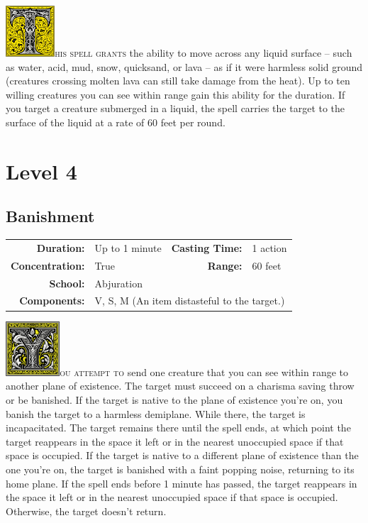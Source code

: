 \documentclass[12pt,showtrims]{memoir}
\begin{document}
\vspace{1\baselineskip}\noindent
\lettrine[lines=4]{\includegraphics[height=54pt]{initials/T.png}}{his spell grants} the ability to move across any liquid surface -- such as water, acid, mud, snow, quicksand, or lava -- as if it were harmless solid ground (creatures crossing molten lava can still take damage from the heat). Up to ten willing creatures you can see within range gain this ability for the duration. If you target a creature submerged in a liquid, the spell carries the target to the surface of the liquid at a rate of 60 feet per round.

\newpage
\chapter*{Level 4} 
\section*{Banishment}

{
\small\centering\vspace{-6pt}
\begin{tabular}{rlrl}
\toprule

\textbf{Duration:} & Up to 1 minute &
\textbf{Casting Time:} & 1 action \\
\textbf{Concentration:} & True &
\textbf{Range:} & 60 feet \\
\textbf{School:} & Abjuration \\
\textbf{Components:} & \multicolumn{3}{p{0.7\textwidth}}{V, S, M (An item distasteful to the target.)}\\

\bottomrule
\end{tabular}
}

\vspace{1\baselineskip}\noindent 
\lettrine[lines=4]{\includegraphics[height=58pt]{initials/Y.png}}{ou attempt to} send one creature that you can see within range to another plane of existence. The target must succeed on a charisma saving throw or be banished. If the target is native to the plane of existence you're on, you banish the target to a harmless demiplane. While there, the target is incapacitated. The target remains there until the spell ends, at which point the target reappears in the space it left or in the nearest unoccupied space if that space is occupied. If the target is native to a different plane of existence than the one you're on, the target is banished with a faint popping noise, returning to its home plane. If the spell ends before 1 minute has passed, the target reappears in the space it left or in the nearest unoccupied space if that space is occupied. Otherwise, the target doesn't return.
\end{document}
